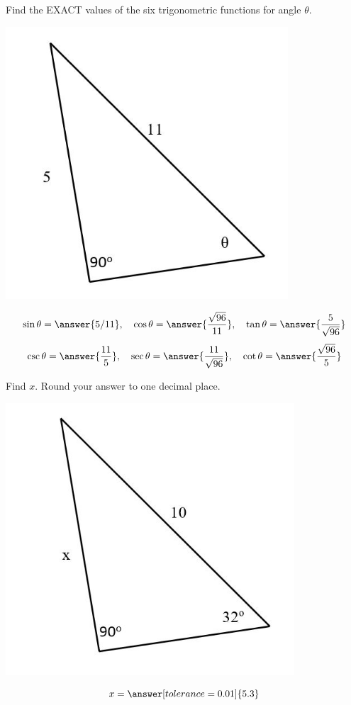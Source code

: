 \documentclass{ximera}
\begin{document}
\begin{problem}\label{prob:160hom10prob3}
Find the EXACT values of the six trigonometric functions for angle $\theta$. 
 
 \begin{image}
   
\includegraphics[height=4in]{160H10pic6.jpg}

\end{image}

$$\sin\theta=\answer{5/11},\quad \cos\theta=\answer{\frac{\sqrt{96}}{11}},\quad\tan\theta=\answer{\frac{5}{\sqrt{96}}}$$
$$\csc\theta=\answer{\frac{11}{5}},\quad\sec\theta=\answer{\frac{11}{\sqrt{96}}},\quad\cot\theta=\answer{\frac{\sqrt{96}}{5}}$$
\end{problem}

\begin{problem}\label{prob:160hom10prob4}
Find $x$.  Round your answer to one decimal place.
 
 \begin{image}
   
\includegraphics[height=4in]{160H10pic7.jpg}

\end{image}
$$x=\answer[tolerance=0.01]{5.3}$$
\end{problem}
\end{document}
